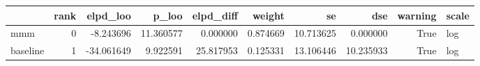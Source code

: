 \begin{tabular}{lrrrrrrrrl}
\toprule
 & rank & elpd_loo & p_loo & elpd_diff & weight & se & dse & warning & scale \\
\midrule
mmm & 0 & -8.243696 & 11.360577 & 0.000000 & 0.874669 & 10.713625 & 0.000000 & True & log \\
baseline & 1 & -34.061649 & 9.922591 & 25.817953 & 0.125331 & 13.106446 & 10.235933 & True & log \\
\bottomrule
\end{tabular}
